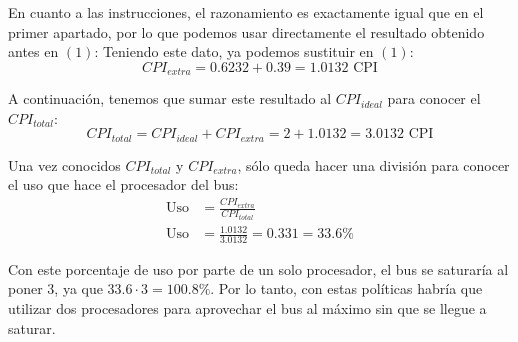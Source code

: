 \documentclass[12pt,a4paper]{article}
\begin{document}
En cuanto a las instrucciones, el razonamiento es exactamente igual que en el primer apartado, por lo que podemos usar directamente el resultado obtenido antes en $(1)$:
Teniendo este dato, ya podemos sustituir en $(1)$:
\begin{equation*}
CPI_{extra}=0.6232+0.39=1.0132\text{ CPI}
\end{equation*}

A continuación, tenemos que sumar este resultado al $CPI_{ideal}$ para conocer el $CPI_{total}$:
\begin{equation*}
CPI_{total}=CPI_{ideal}+CPI_{extra}=2+1.0132=3.0132\text{ CPI}
\end{equation*}

Una vez conocidos $CPI_{total}$ y $CPI_{extra}$, sólo queda hacer una división para conocer el uso que hace el procesador del bus:
\begin{align*}
\text{Uso}&=\frac{CPI_{extra}}{CPI_{total}}\\
\text{Uso}&=\frac{1.0132}{3.0132} = 0.331 = 33.6\%
\end{align*}

Con este porcentaje de uso por parte de un solo procesador, el bus se saturaría al poner 3, ya que $33.6\cdot 3=100.8\%$. Por lo tanto, con estas políticas habría que utilizar dos procesadores para aprovechar el bus al máximo sin que se llegue a saturar.



\end{document}

